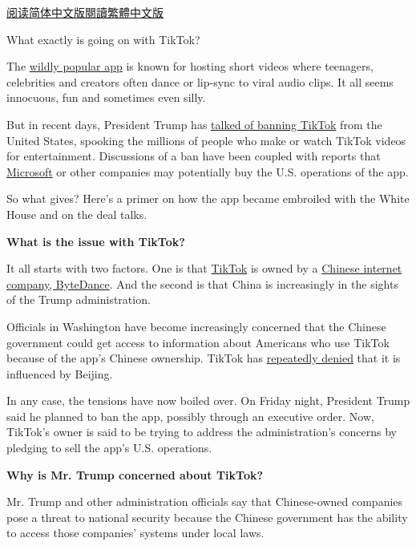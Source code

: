 \href{https://cn.nytimes.com/technology/20200803/tiktok-trump-microsoft-bytedance-china-ban/}{阅读简体中文版}\href{https://cn.nytimes.com/technology/20200803/tiktok-trump-microsoft-bytedance-china-ban/zh-hant/}{閱讀繁體中文版}

What exactly is going on with TikTok?

The
\href{https://www.nytimes.com/2020/06/03/technology/tiktok-is-the-future.html}{wildly
popular app} is known for hosting short videos where teenagers,
celebrities and creators often dance or lip-sync to viral audio clips.
It all seems innocuous, fun and sometimes even silly.

But in recent days, President Trump has
\href{https://www.nytimes.com/2020/08/02/style/tiktok-ban-threat-trump.html}{talked
of banning TikTok} from the United States, spooking the millions of
people who make or watch TikTok videos for entertainment. Discussions of
a ban have been coupled with reports that
\href{https://www.nytimes.com/2020/08/03/technology/tiktok-microsoft-tweens.html}{Microsoft}
or other companies may potentially buy the U.S. operations of the app.

So what gives? Here's a primer on how the app became embroiled with the
White House and on the deal talks.

\textbf{What is the issue with TikTok?}

It all starts with two factors. One is that
\href{https://www.nytimes.com/2020/08/03/technology/trump-tiktok-microsoft.html}{TikTok}
is owned by a
\href{https://www.nytimes.com/2020/08/03/technology/tiktok-trump-sale-microsoft.html}{Chinese
internet company, ByteDance}. And the second is that China is
increasingly in the sights of the Trump administration.

Officials in Washington have become increasingly concerned that the
Chinese government could get access to information about Americans who
use TikTok because of the app's Chinese ownership. TikTok has
\href{https://www.nytimes.com/2019/11/18/technology/tiktok-alex-zhu-interview.html}{repeatedly
denied} that it is influenced by Beijing.

In any case, the tensions have now boiled over. On Friday night,
President Trump said he planned to ban the app, possibly through an
executive order. Now, TikTok's owner is said to be trying to address the
administration's concerns by pledging to sell the app's U.S. operations.

\textbf{Why is Mr. Trump concerned about TikTok?}

Mr. Trump and other administration officials say that Chinese-owned
companies pose a threat to national security because the Chinese
government has the ability to access those companies' systems under
local laws.

